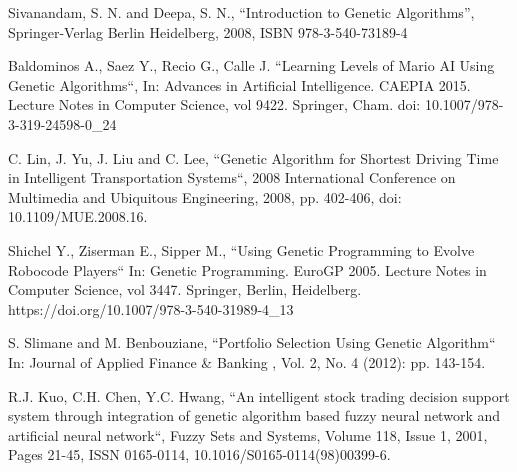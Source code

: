 \documentclass[conference]{IEEEtran}
\begin{document}
\begin{thebibliography}{00}

Sivanandam, S. N. and Deepa, S. N., ``Introduction to Genetic Algorithms'',
	Springer-Verlag Berlin Heidelberg, 2008, ISBN 978-3-540-73189-4
	

Baldominos A., Saez Y., Recio G., Calle J. ``Learning Levels of Mario AI Using Genetic Algorithms``,
	In: Advances in Artificial Intelligence. CAEPIA 2015. Lecture Notes in Computer Science, vol 9422. Springer, Cham. doi: 10.1007/978-3-319-24598-0\_24

C. Lin, J. Yu, J. Liu and C. Lee, ``Genetic Algorithm for Shortest Driving Time in Intelligent Transportation Systems``, 2008 International Conference on Multimedia and Ubiquitous Engineering, 2008, pp. 402-406, doi: 10.1109/MUE.2008.16.

Shichel Y., Ziserman E., Sipper M., ``Using Genetic Programming to Evolve Robocode Players`` In: Genetic Programming. EuroGP 2005. Lecture Notes in Computer Science, vol 3447. Springer, Berlin, Heidelberg. https://doi.org/10.1007/978-3-540-31989-4\_13

S. Slimane and M. Benbouziane, ``Portfolio Selection Using Genetic Algorithm`` In: Journal of Applied Finance \& Banking , Vol. 2, No. 4 (2012): pp. 143-154.

R.J. Kuo, C.H. Chen, Y.C. Hwang, ``An intelligent stock trading decision support system through integration of genetic algorithm based fuzzy neural network and artificial neural network``,
Fuzzy Sets and Systems,
Volume 118, Issue 1,
2001,
Pages 21-45,
ISSN 0165-0114,
10.1016/S0165-0114(98)00399-6.


\end{thebibliography}
\end{document}
